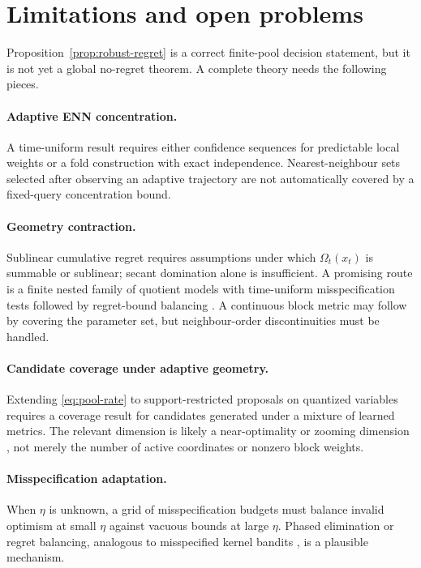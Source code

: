 \documentclass[11pt]{article}
\theoremstyle{definition}
\theoremstyle{remark}
\newcommand{\1}{\mathbf 1}
\begin{document}
\section{Limitations and open problems}

Proposition~\ref{prop:robust-regret} is a correct finite-pool decision statement, but it is not yet a
global no-regret theorem.  A complete theory needs the following pieces.

\paragraph{Adaptive ENN concentration.}
A time-uniform result requires either confidence sequences for predictable local weights or a fold
construction with exact independence.  Nearest-neighbour sets selected after observing an adaptive
trajectory are not automatically covered by a fixed-query concentration bound.

\paragraph{Geometry contraction.}
Sublinear cumulative regret requires assumptions under which $\Omega_t(x_t)$ is summable or
sublinear; secant domination alone is insufficient.  A promising route is a finite nested family of
quotient models with time-uniform misspecification tests followed by regret-bound balancing
\cite{DynamicBalancing,ModelSelection}.  A continuous block metric may follow by covering the
parameter set, but neighbour-order discontinuities must be handled.

\paragraph{Candidate coverage under adaptive geometry.}
Extending \eqref{eq:pool-rate} to support-restricted proposals on quantized variables requires a
coverage result for candidates generated under a mixture of learned metrics.  The relevant dimension
is likely a near-optimality or zooming dimension
\cite{XArmed}, not merely the number of active coordinates or nonzero block weights.

\paragraph{Misspecification adaptation.}
When $\eta$ is unknown, a grid of misspecification budgets must balance invalid optimism at small
$\eta$ against vacuous bounds at large $\eta$.  Phased elimination or regret balancing, analogous
to misspecified kernel bandits \cite{MisspecifiedGP}, is a plausible mechanism.
\end{document}
